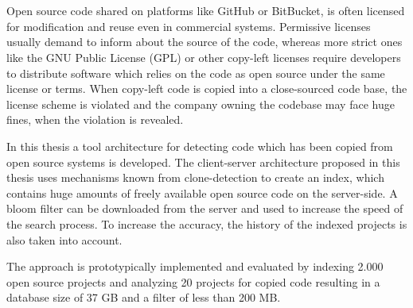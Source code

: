 \chapter{\abstractname}
Open source code shared on platforms like GitHub or BitBucket, is often licensed for modification and reuse even in commercial systems.
Permissive licenses usually demand to inform about the source of the code, whereas more strict ones like the GNU Public License (GPL) or other copy-left licenses require developers to distribute software which relies on the code as open source under the same license or terms.
When copy-left code is copied into a close-sourced code base, the license scheme is violated and the company owning the codebase may face huge fines, when the violation is revealed.

In this thesis a tool architecture for detecting code which has been copied from open source systems is developed.
The client-server architecture proposed in this thesis uses mechanisms known from clone-detection to create an index, which contains huge amounts of freely available open source code on the server-side.
A bloom filter can be downloaded from the server and used to increase the speed of the search process.
To increase the accuracy, the history of the indexed projects is also taken into account.

The approach is prototypically implemented and evaluated by indexing 2.000 open source projects and analyzing 20 projects for copied code resulting in a database size of 37 GB and a filter of less than 200 MB.